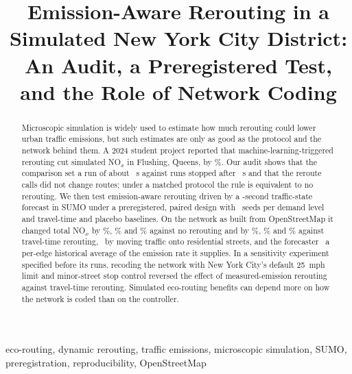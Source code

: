 \documentclass[conference]{IEEEtran}
\begin{document}
\title{Emission-Aware Rerouting in a Simulated New York City District: An Audit, a Preregistered Test, and the
Role of Network Coding}
\author{
\and
{}
}
\maketitle

\begin{abstract}
Microscopic simulation is widely used to estimate how much rerouting could lower urban traffic emissions, but such
estimates are only as good as the protocol and the network behind them. A 2024 student project reported that
machine-learning-triggered rerouting cut simulated NO$_x$ in Flushing, Queens, by \LegacyNOxDropRF\%. Our audit shows
that the comparison set a run of about \LegacyBaselineHorizon~s against runs stopped after \LegacyControlledSteps~s
and that the reroute calls did not change routes; under a matched protocol the rule is equivalent to no rerouting.
We then test emission-aware rerouting driven by a \HorizonS-second traffic-state forecast in SUMO under a
preregistered, paired design with \ConfirmatoryN\ seeds per demand level and travel-time and placebo baselines. On the
network as built from OpenStreetMap it changed total NO$_x$ by \PCTwoLightMean\%, \PCTwoModerateMean\% and
\PCTwoHeavyMean\% against no rerouting and by \PCThreeLightMean\%, \PCThreeModerateMean\% and \PCThreeHeavyMean\%
against travel-time rerouting, \CompositionWord\ by moving traffic onto residential streets, and the forecaster
\ForecastVerdictR\ a per-edge historical average of the emission rate it supplies. In a sensitivity experiment
specified before its runs, recoding the network with New York City's default 25~mph limit and minor-street stop
control reversed the effect of measured-emission rerouting against travel-time rerouting. Simulated eco-routing
benefits can depend more on how the network is coded than on the controller.
\end{abstract}

\begin{IEEEkeywords}
eco-routing, dynamic rerouting, traffic emissions, microscopic simulation, SUMO, preregistration, reproducibility,
OpenStreetMap
\end{IEEEkeywords}
\end{document}
